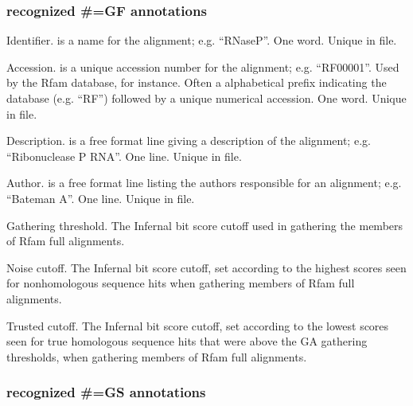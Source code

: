 \subsubsection{recognized \#=GF annotations}
\begin{sreitems}{}
\item [\emprog{ID  <s>}] 
        Identifier.  is a name for the alignment;
        e.g. ``RNaseP''. One word. Unique in file.

\item [\emprog{AC  <s>}]
        Accession.  is a unique accession number for the
        alignment; e.g. 
        ``RF00001''. Used by the Rfam database, for instance. 
        Often a alphabetical prefix indicating the database
        (e.g. ``RF'') followed by a unique numerical accession.
        One word. Unique in file. 
        
\item [\emprog{DE  <s>}]
        Description.  is a free format line giving
        a description of the alignment; e.g.
        ``Ribonuclease P RNA''. One line. Unique in file.

\item [\emprog{AU  <s>}]
        Author.  is a free format line listing the 
        authors responsible for an alignment; e.g. 
        ``Bateman A''. One line. Unique in file.

\item [\emprog{GA  <f>}]
        Gathering threshold. The Infernal bit score cutoff 
        used in gathering the members of Rfam full alignments. 
        
\item [\emprog{NC <f>}] 
        Noise cutoff. The Infernal bit score cutoff, set according to
        the highest scores seen for nonhomologous sequence hits when
        gathering members of Rfam full alignments.

\item [\emprog{TC  <f>}]
        Trusted cutoff. The Infernal bit score cutoff, set according
        to the lowest scores seen for true homologous sequence hits
        that were above the GA gathering thresholds, when gathering
        members of Rfam full alignments.
\end{sreitems}

\subsubsection{recognized \#=GS annotations}

